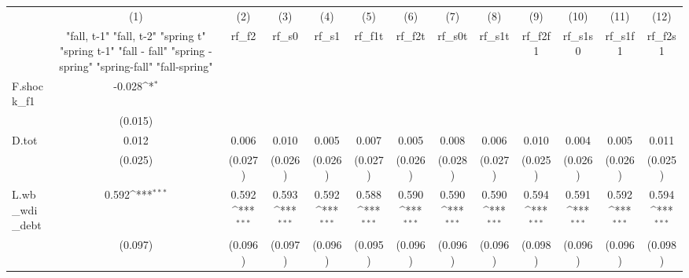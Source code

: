 {
\def\sym#1{\ifmmode^{#1}\else\(^{#1}\)\fi}
\begin{tabular}{l*{12}{c}}
\toprule
            &\multicolumn{1}{c}{(1)}&\multicolumn{1}{c}{(2)}&\multicolumn{1}{c}{(3)}&\multicolumn{1}{c}{(4)}&\multicolumn{1}{c}{(5)}&\multicolumn{1}{c}{(6)}&\multicolumn{1}{c}{(7)}&\multicolumn{1}{c}{(8)}&\multicolumn{1}{c}{(9)}&\multicolumn{1}{c}{(10)}&\multicolumn{1}{c}{(11)}&\multicolumn{1}{c}{(12)}\\
            &\multicolumn{1}{c}{  "fall, t-1" "fall, t-2" "spring t" "spring t-1"  "fall - fall" "spring - spring" "spring-fall" "fall-spring" }&\multicolumn{1}{c}{rf\_f2}&\multicolumn{1}{c}{rf\_s0}&\multicolumn{1}{c}{rf\_s1}&\multicolumn{1}{c}{rf\_f1t}&\multicolumn{1}{c}{rf\_f2t}&\multicolumn{1}{c}{rf\_s0t}&\multicolumn{1}{c}{rf\_s1t}&\multicolumn{1}{c}{rf\_f2f1}&\multicolumn{1}{c}{rf\_s1s0}&\multicolumn{1}{c}{rf\_s1f1}&\multicolumn{1}{c}{rf\_f2s1}\\
\midrule
F.shock\_f1  &      -0.028\sym{*}  &                     &                     &                     &                     &                     &                     &                     &                     &                     &                     &                     \\
            &     (0.015)         &                     &                     &                     &                     &                     &                     &                     &                     &                     &                     &                     \\
\addlinespace
D.tot       &       0.012         &       0.006         &       0.010         &       0.005         &       0.007         &       0.005         &       0.008         &       0.006         &       0.010         &       0.004         &       0.005         &       0.011         \\
            &     (0.025)         &     (0.027)         &     (0.026)         &     (0.026)         &     (0.027)         &     (0.026)         &     (0.028)         &     (0.027)         &     (0.025)         &     (0.026)         &     (0.026)         &     (0.025)         \\
\addlinespace
L.wb\_wdi\_debt&       0.592\sym{***}&       0.592\sym{***}&       0.593\sym{***}&       0.592\sym{***}&       0.588\sym{***}&       0.590\sym{***}&       0.590\sym{***}&       0.590\sym{***}&       0.594\sym{***}&       0.591\sym{***}&       0.592\sym{***}&       0.594\sym{***}\\
            &     (0.097)         &     (0.096)         &     (0.097)         &     (0.096)         &     (0.095)         &     (0.096)         &     (0.096)         &     (0.096)         &     (0.098)         &     (0.096)         &     (0.096)         &     (0.098)         \\

\end{tabular}}
